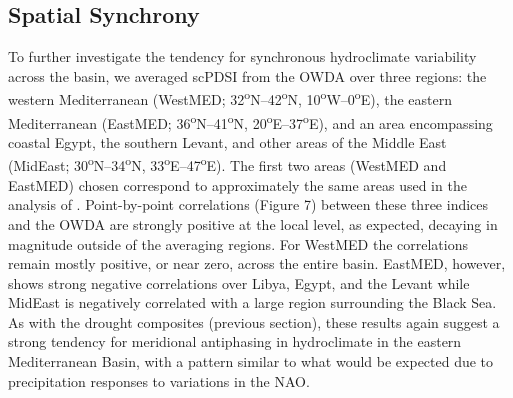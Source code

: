 \documentclass[draft,jgr]{AGUTeX}
\begin{document}
\begin{article}
\subsection{Spatial Synchrony}
\noindent To further investigate the tendency for synchronous hydroclimate variability across the basin, we averaged scPDSI from the OWDA over three regions: the western Mediterranean (WestMED; 32\textsuperscript{o}N--42\textsuperscript{o}N, 10\textsuperscript{o}W--0\textsuperscript{o}E), the eastern Mediterranean (EastMED; 36\textsuperscript{o}N--41\textsuperscript{o}N, 20\textsuperscript{o}E--37\textsuperscript{o}E), and an area encompassing coastal Egypt, the southern Levant, and other areas of the Middle East (MidEast; 30\textsuperscript{o}N--34\textsuperscript{o}N, 33\textsuperscript{o}E--47\textsuperscript{o}E). The first two areas (WestMED and EastMED) chosen correspond to approximately the same areas used in the analysis of \cite{Roberts:etal2012}. Point-by-point correlations (Figure 7) between these three indices and the OWDA are strongly positive at the local level, as expected, decaying in magnitude outside of the averaging regions. For WestMED the correlations remain mostly positive, or near zero, across the entire basin. EastMED, however, shows strong negative correlations over Libya, Egypt, and the Levant while MidEast is negatively correlated with a large region surrounding the Black Sea. As with the drought composites (previous section), these results again suggest a strong tendency for meridional antiphasing in hydroclimate in the eastern Mediterranean Basin, with a pattern similar to what would be expected due to precipitation responses to variations in the NAO.\\

\end{article}
\end{document}
